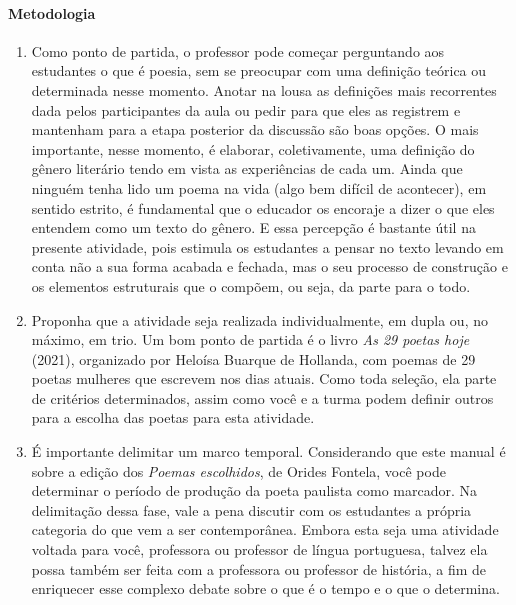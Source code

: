 \documentclass[12pt]{extarticle}
\begin{document}
\paragraph{Metodologia}
\begin{enumerate}
\item Como ponto de partida, o professor pode começar
perguntando aos estudantes o que é poesia, sem se preocupar com uma
definição teórica ou determinada nesse momento. Anotar na lousa as
definições mais recorrentes dada pelos participantes da aula ou pedir
para que eles as registrem e mantenham para a etapa posterior da
discussão são boas opções. O mais importante, nesse momento, é elaborar,
coletivamente, uma definição do gênero literário tendo em vista as
experiências de cada um. Ainda que ninguém tenha lido um poema na vida
(algo bem difícil de acontecer), em sentido estrito, é fundamental que o
educador os encoraje a dizer o que eles entendem como um texto do
gênero. E essa percepção é bastante útil na presente atividade, pois
estimula os estudantes a pensar no texto levando em conta não a sua
forma acabada e fechada, mas o seu processo de construção e os elementos
estruturais que o compõem, ou seja, da parte para o todo.

\item Proponha que a atividade seja realizada individualmente, em dupla ou,
no máximo, em trio. Um bom ponto de partida é o livro \emph{As 29 poetas
hoje} (2021), organizado por Heloísa Buarque de Hollanda, com poemas de
29 poetas mulheres que escrevem nos dias atuais. Como toda seleção, ela
parte de critérios determinados, assim como você e a turma podem definir
outros para a escolha das poetas para esta atividade.



\item É importante delimitar um marco temporal. Considerando que este
manual é sobre a edição dos \emph{Poemas escolhidos}, de Orides Fontela,
você pode determinar o período de produção da poeta paulista como
marcador. Na delimitação dessa fase, vale a pena discutir com os
estudantes a própria categoria do que vem a ser contemporânea. Embora
esta seja uma atividade voltada para você, professora ou professor de
língua portuguesa, talvez ela possa também ser feita com a professora ou
professor de história, a fim de enriquecer esse complexo debate sobre o
que é o tempo e o que o determina.


\end{enumerate}
\end{document}
